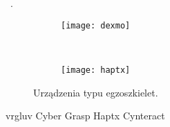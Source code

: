 ~\cite{haptx}.	
	
\begin{figure}[h]
\centering
	\begin{subfigure}[b]{0.4\textwidth}
	\texttt{[image: dexmo]}
	\label{fig:dexmo}
	\end{subfigure}
	~
	\begin{subfigure}[b]{0.4\textwidth}
	\texttt{[image: haptx]}
	\label{fig:haptx}
	\end{subfigure}
\caption{Urządzenia typu egzoszkielet.}
\label{fig:egzo}
\end{figure}	
	
	
	vrgluv
	Cyber Grasp
	Haptx
	Cynteract